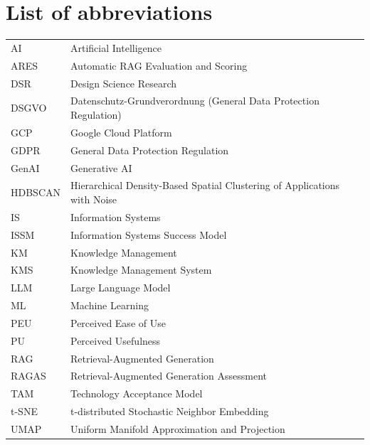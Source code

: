 \documentclass[
	english,
	ruledheaders=section,%
	class=report,%
	thesis={type=bachelor},%
	accentcolor=1b,%
	custommargins=true,%
	marginpar=false,%
	parskip=half-,%
	fontsize=11pt,%
	DIV=14,
]{tudapub}
\begin{document}

\chapter*{List of abbreviations}

\begin{xtabular}{ll}
AI & Artificial Intelligence\\
ARES & Automatic RAG Evaluation and Scoring \\
DSR & Design Science Research\\
DSGVO & Datenschutz-Grundverordnung (General Data Protection Regulation)\\
GCP & Google Cloud Platform\\
GDPR & General Data Protection Regulation\\
GenAI & Generative AI\\
HDBSCAN & Hierarchical Density-Based Spatial Clustering of Applications with Noise\\
IS & Information Systems\\
ISSM & Information Systems Success Model\\
KM & Knowledge Management\\
KMS & Knowledge Management System\\
LLM & Large Language Model\\
ML & Machine Learning\\
PEU & Perceived Ease of Use\\
PU & Perceived Usefulness\\
RAG & Retrieval-Augmented Generation\\
RAGAS & Retrieval-Augmented Generation Assessment \\
TAM & Technology Acceptance Model\\
t-SNE & t-distributed Stochastic Neighbor Embedding \\
UMAP & Uniform Manifold Approximation and Projection\\
\end{xtabular} 
\end{document}
